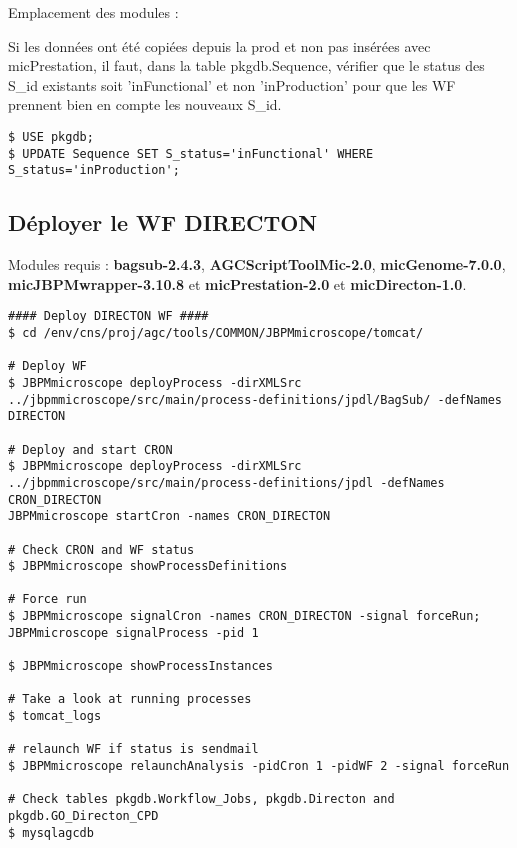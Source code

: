Emplacement des modules : 
\newline

\begin{mycolorbox}
	Si les données ont été copiées depuis la prod et non pas insérées avec micPrestation, il faut, dans la table pkgdb.Sequence, vérifier que le status des S\_id existants soit 'inFunctional' et non 'inProduction' pour que les WF prennent bien en compte les nouveaux S\_id.
\end{mycolorbox}

\begin{lstlisting}[style=SQL]
$ USE pkgdb;
$ UPDATE Sequence SET S_status='inFunctional' WHERE S_status='inProduction';
\end{lstlisting}

\subsection{Déployer le WF DIRECTON}
Modules requis : \textbf{bagsub-2.4.3}, \textbf{AGCScriptToolMic-2.0}, \textbf{micGenome-7.0.0}, \textbf{micJBPMwrapper-3.10.8} et \textbf{micPrestation-2.0} et \textbf{micDirecton-1.0}.

\begin{lstlisting}[style=bash]
#### Deploy DIRECTON WF ####
$ cd /env/cns/proj/agc/tools/COMMON/JBPMmicroscope/tomcat/

# Deploy WF
$ JBPMmicroscope deployProcess -dirXMLSrc ../jbpmmicroscope/src/main/process-definitions/jpdl/BagSub/ -defNames DIRECTON

# Deploy and start CRON
$ JBPMmicroscope deployProcess -dirXMLSrc ../jbpmmicroscope/src/main/process-definitions/jpdl -defNames CRON_DIRECTON
JBPMmicroscope startCron -names CRON_DIRECTON

# Check CRON and WF status
$ JBPMmicroscope showProcessDefinitions

# Force run
$ JBPMmicroscope signalCron -names CRON_DIRECTON -signal forceRun; JBPMmicroscope signalProcess -pid 1

$ JBPMmicroscope showProcessInstances

# Take a look at running processes
$ tomcat_logs

# relaunch WF if status is sendmail
$ JBPMmicroscope relaunchAnalysis -pidCron 1 -pidWF 2 -signal forceRun

# Check tables pkgdb.Workflow_Jobs, pkgdb.Directon and pkgdb.GO_Directon_CPD
$ mysqlagcdb
\end{lstlisting}
